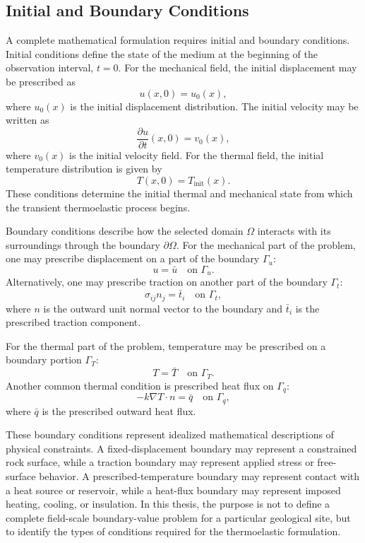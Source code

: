 \subsection{Initial and Boundary Conditions}

A complete mathematical formulation requires initial and boundary conditions. Initial conditions define the state of the medium at the beginning of the observation interval, \(t=0\). For the mechanical field, the initial displacement may be prescribed as
\begin{equation}
u(x,0)
=
u_0(x),
\end{equation}
where \(u_0(x)\) is the initial displacement distribution. The initial velocity may be written as
\begin{equation}
\frac{\partial u}{\partial t}(x,0)
=
v_0(x),
\end{equation}
where \(v_0(x)\) is the initial velocity field. For the thermal field, the initial temperature distribution is given by
\begin{equation}
T(x,0)
=
T_{\mathrm{init}}(x).
\end{equation}
These conditions determine the initial thermal and mechanical state from which the transient thermoelastic process begins.

Boundary conditions describe how the selected domain \(\Omega\) interacts with its surroundings through the boundary \(\partial\Omega\). For the mechanical part of the problem, one may prescribe displacement on a part of the boundary \(\Gamma_u\):
\begin{equation}
u
=
\bar{u}
\quad
\text{on } \Gamma_u .
\end{equation}
Alternatively, one may prescribe traction on another part of the boundary \(\Gamma_t\):
\begin{equation}
\sigma_{ij}n_j
=
\bar{t}_i
\quad
\text{on } \Gamma_t ,
\end{equation}
where \(n\) is the outward unit normal vector to the boundary and \(\bar{t}_i\) is the prescribed traction component.

For the thermal part of the problem, temperature may be prescribed on a boundary portion \(\Gamma_T\):
\begin{equation}
T
=
\bar{T}
\quad
\text{on } \Gamma_T .
\end{equation}
Another common thermal condition is prescribed heat flux on \(\Gamma_q\):
\begin{equation}
-k\nabla T \cdot n
=
\bar{q}
\quad
\text{on } \Gamma_q ,
\end{equation}
where \(\bar{q}\) is the prescribed outward heat flux.

These boundary conditions represent idealized mathematical descriptions of physical constraints. A fixed-displacement boundary may represent a constrained rock surface, while a traction boundary may represent applied stress or free-surface behavior. A prescribed-temperature boundary may represent contact with a heat source or reservoir, while a heat-flux boundary may represent imposed heating, cooling, or insulation. In this thesis, the purpose is not to define a complete field-scale boundary-value problem for a particular geological site, but to identify the types of conditions required for the thermoelastic formulation.
